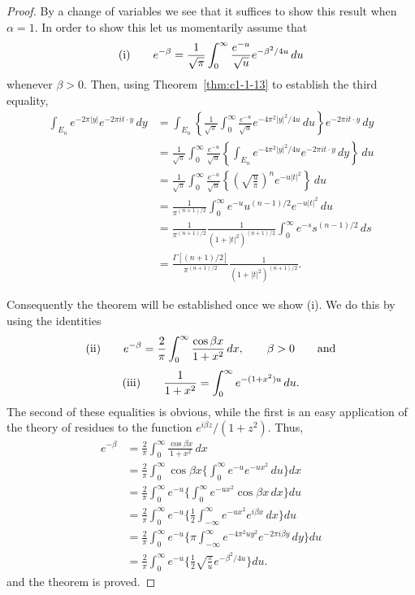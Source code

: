 \begin{proof}
By a change of variables we see that it suffices to show this result when
$\alpha = 1$. In order to show this let us momentarily assume that
\[
\textup{(i)}\qquad
e^{-\beta}=\frac{1}{\sqrt{\pi}}\int_{0}^{\infty}\frac{e^{-u}}{\sqrt{u}}e^{-\beta^{2}/4u}\,du
\]
whenever $\beta > 0$. Then, using Theorem~\ref{thm:c1-1-13} to establish the
third equality,
\begin{align*}
\int_{E_{n}}e^{-2\pi|y|}e^{-2\pi i t\cdot y}\,dy
&=\int_{E_{n}}\left\{\frac{1}{\sqrt{\pi}}\int_{0}^{\infty}\frac{e^{-u}}{\sqrt{u}}e^{-4\pi^{2}|y|^{2}/4u}\,du\right\}e^{-2\pi i t\cdot y}\,dy\\
&=\frac{1}{\sqrt{\pi}}\int_{0}^{\infty}\frac{e^{-u}}{\sqrt{u}}\left\{\int_{E_{n}}e^{-4\pi^{2}|y|^{2}/4u}e^{-2\pi i t\cdot y}\,dy\right\}\,du\\
&=\frac{1}{\sqrt{\pi}}\int_{0}^{\infty}\frac{e^{-u}}{\sqrt{u}}\left\{\left(\sqrt{\frac{u}{\pi}}\right)^{n}e^{-u|t|^{2}}\right\}\,du\\
&=\frac{1}{\pi^{(n+1)/2}}\int_{0}^{\infty}e^{-u}u^{(n-1)/2}e^{-u|t|^{2}}\,du\\
&=\frac{1}{\pi^{(n+1)/2}}\frac{1}{(1+|t|^{2})^{(n+1)/2}}\int_{0}^{\infty}e^{-s}s^{(n-1)/2}\,ds\\
&=\frac{\Gamma[(n+1)/2]}{\pi^{(n+1)/2}}\frac{1}{(1+|t|^{2})^{(n+1)/2}}.
\end{align*}

Consequently the theorem will be established once we show (i). We do this by
using the identities
\[
\textup{(ii)}\qquad
e^{-\beta}=\frac{2}{\pi}\int_{0}^{\infty}\frac{\cos\beta x}{1+x^{2}}\,dx,\qquad\beta>0
\qquad\text{and}
\]
\[
\textup{(iii)}\qquad
\frac{1}{1+x^{2}}=\int_{0}^{\infty}e^{-(1+x^{2})u}\,du.
\]
The second of these equalities is obvious, while the first is an easy
application of the theory of residues to the function $e^{i\beta z}/(1 + z^{2})$.
Thus,
\begin{align*}
e^{-\beta}&=\frac{2}{\pi}\int_{0}^{\infty}\frac{\cos\beta x}{1+x^{2}}\,dx\\
&=\frac{2}{\pi}\int_{0}^{\infty}\cos\beta x\Biggl\{\int_{0}^{\infty}e^{-u}e^{-ux^{2}}\,du\Biggr\}dx\\
&=\frac{2}{\pi}\int_{0}^{\infty}e^{-u}\Biggl\{\int_{0}^{\infty}e^{-ux^{2}}\cos\beta x\,dx\Biggr\}du\\
&=\frac{2}{\pi}\int_{0}^{\infty}e^{-u}\Biggl\{\frac{1}{2}\int_{-\infty}^{\infty}e^{-ux^{2}}e^{i\beta x}\,dx\Biggr\}du\\
&=\frac{2}{\pi}\int_{0}^{\infty}e^{-u}\Biggl\{\pi\int_{-\infty}^{\infty}e^{-4\pi^{2}uy^{2}}e^{-2\pi i\beta y}\,dy\Biggr\}du\\
&=\frac{2}{\pi}\int_{0}^{\infty}e^{-u}\Biggl\{\frac{1}{2}\sqrt{\frac{\pi}{u}}e^{-\beta^{2}/4u}\Biggr\}du.
\end{align*}
and the theorem is proved.
\end{proof}

